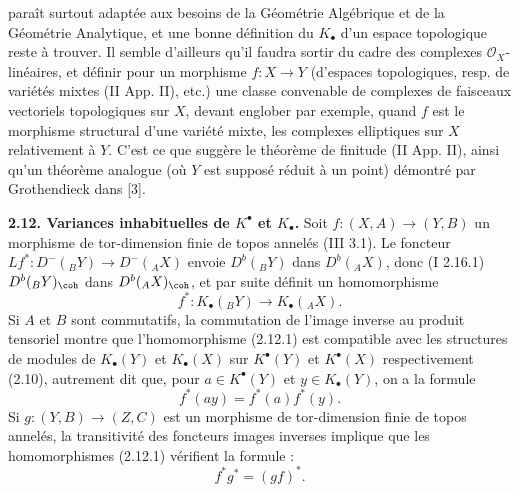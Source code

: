 paraît surtout adaptée aux besoins de la Géométrie Algébrique et de la Géométrie Analytique, et une bonne définition du \(K_{\bullet}\) d'un espace topologique reste à trouver. Il semble d'ailleurs qu'il faudra sortir du cadre des complexes \(\mathcal O_X\)-linéaires, et définir pour un morphisme \(f:X\to Y\) (d'espaces topologiques, resp. de variétés mixtes (II App. II), etc.) une classe convenable de complexes de faisceaux vectoriels topologiques sur \(X\), devant englober par exemple, quand \(f\) est le morphisme structural d'une variété mixte, les complexes elliptiques sur \(X\) relativement à \(Y\). C'est ce que suggère le théorème de finitude (II App. II), ainsi qu'un théorème analogue (où \(Y\) est supposé réduit à un point) démontré par Grothendieck dans [3].

\textbf{2.12. Variances inhabituelles de \(K^{\bullet}\) et \(K_{\bullet}\).} Soit \(f:(X,A)\longrightarrow(Y,B)\) un morphisme de tor-dimension finie de topos annelés (III 3.1). Le foncteur \(Lf^*:D^-({}_B Y)\longrightarrow D^-({}_A X)\) envoie \(D^b({}_B Y)\) dans \(D^b({}_A X)\), donc (I 2.16.1) \(D^b({}_B Y)_{\coh}\) dans \(D^b({}_A X)_{\coh}\), et par suite définit un homomorphisme
\begin{equation}\tag{2.12.1}
 f^*:K_\bullet({}_B Y)\longrightarrow K_\bullet({}_A X).
\end{equation}
Si \(A\) et \(B\) sont commutatifs, la commutation de l'image inverse au produit tensoriel montre que l'homomorphisme (2.12.1) est compatible avec les structures de modules de \(K_{\bullet}(Y)\) et \(K_{\bullet}(X)\) sur \(K^{\bullet}(Y)\) et \(K^{\bullet}(X)\) respectivement (2.10), autrement dit que, pour \(a\in K^{\bullet}(Y)\) et \(y\in K_{\bullet}(Y)\), on a la formule
\begin{equation}\tag{2.12.2}
 f^*(ay)=f^*(a)f^*(y).
\end{equation}
Si \(g:(Y,B)\to(Z,C)\) est un morphisme de tor-dimension finie de topos annelés, la transitivité des foncteurs images inverses implique que les homomorphismes (2.12.1) vérifient la formule :
\begin{equation}\tag{2.12.1.1}
 f^*g^*=(gf)^*.
\end{equation}

